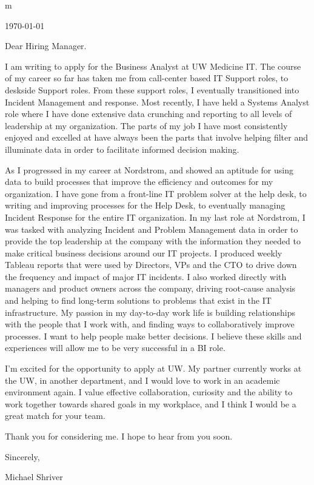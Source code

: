 \documentclass[10pt,oneside]{article}
\begin{document}
m

\hfill\dte\today
\heading
\vspace{\baselineskip}
\vspace{\baselineskip}

Dear Hiring Manager.

\vspace{\baselineskip}

I am writing to apply for the Business Analyst at UW Medicine IT. The course of my career so far has taken me from call-center based IT Support roles, to deskside Support roles. From these support roles, I eventually transitioned into Incident Management and response. Most recently, I have held a Systems Analyst role where I have done extensive data crunching and reporting to all levels of leadership at my organization. The parts of my job I have most consistently enjoyed and excelled at have always been the parts that involve helping filter and illuminate data in order to facilitate informed decision making.

\vspace{\baselineskip}

As I progressed in my career at Nordstrom, and showed an aptitude for using data to build processes that improve the efficiency and outcomes for my organization. I have gone from a front-line IT problem solver at the help desk, to writing and improving processes for the Help Desk, to eventually managing Incident Response for the entire IT organization. In my last role at Nordstrom, I was tasked with analyzing Incident and Problem Management data in order to provide the top leadership at the company with the information they needed to make critical business decisions around our IT projects. I produced weekly Tableau reports that were used by Directors, VPs and the CTO to drive down the frequency and impact of major IT incidents. I also worked directly with managers and product owners across the company, driving root-cause analysis and helping to find long-term solutions to problems that exist in the IT infrastructure. My passion in my day-to-day work life is building relationships with the people that I work with, and finding ways to collaboratively improve processes. I want to help people make better decisions. I believe these skills and experiences will allow me to be very successful in a BI role.

\vspace{\baselineskip}

I’m excited for the opportunity to apply at UW. My partner currently works at the UW, in another department, and I would love to work in an academic environment again. I value effective collaboration, curiosity and the ability to work together towards shared goals in my workplace, and I think I would be a great match for your team.

\vspace{\baselineskip}

Thank you for considering me. I hope to hear from you soon.

\vspace{\baselineskip}

Sincerely,

\vspace{\baselineskip}

Michael Shriver
\end{document}
